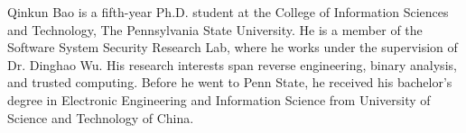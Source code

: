 
Qinkun Bao is a fifth-year Ph.D. student at the College of Information Sciences
and Technology, The Pennsylvania State University. He is a member of the Software 
System Security Research Lab, where he works under the supervision of Dr. Dinghao Wu.
His research interests span reverse engineering, binary analysis, and trusted computing. Before he went to Penn State, he received his bachelor's degree in Electronic Engineering and Information Science from University of Science and Technology of China.